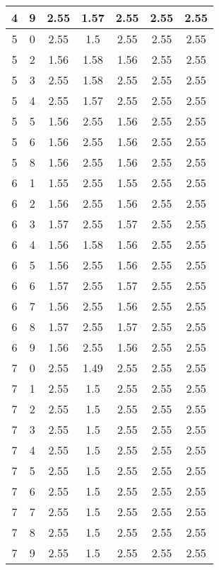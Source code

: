 \begin{longtable}{|c|c||c||c||c|c|c|}
	4 & 9 & 2.55 & 1.57 & 2.55 & 2.55 & 2.55 \\ \hline
	5 & 0 & 2.55 & 1.5 & 2.55 & 2.55 & 2.55 \\ \hline
	5 & 2 & 1.56 & 1.58 & 1.56 & 2.55 & 2.55 \\ \hline
	5 & 3 & 2.55 & 1.58 & 2.55 & 2.55 & 2.55 \\ \hline
	5 & 4 & 2.55 & 1.57 & 2.55 & 2.55 & 2.55 \\ \hline
	5 & 5 & 1.56 & 2.55 & 1.56 & 2.55 & 2.55 \\ \hline
	5 & 6 & 1.56 & 2.55 & 1.56 & 2.55 & 2.55 \\ \hline
	5 & 8 & 1.56 & 2.55 & 1.56 & 2.55 & 2.55 \\ \hline
	6 & 1 & 1.55 & 2.55 & 1.55 & 2.55 & 2.55 \\ \hline
	6 & 2 & 1.56 & 2.55 & 1.56 & 2.55 & 2.55 \\ \hline
	6 & 3 & 1.57 & 2.55 & 1.57 & 2.55 & 2.55 \\ \hline
	6 & 4 & 1.56 & 1.58 & 1.56 & 2.55 & 2.55 \\ \hline
	6 & 5 & 1.56 & 2.55 & 1.56 & 2.55 & 2.55 \\ \hline
	6 & 6 & 1.57 & 2.55 & 1.57 & 2.55 & 2.55 \\ \hline
	6 & 7 & 1.56 & 2.55 & 1.56 & 2.55 & 2.55 \\ \hline
	6 & 8 & 1.57 & 2.55 & 1.57 & 2.55 & 2.55 \\ \hline
	6 & 9 & 1.56 & 2.55 & 1.56 & 2.55 & 2.55 \\ \hline
	7 & 0 & 2.55 & 1.49 & 2.55 & 2.55 & 2.55 \\ \hline
	7 & 1 & 2.55 & 1.5 & 2.55 & 2.55 & 2.55 \\ \hline
	7 & 2 & 2.55 & 1.5 & 2.55 & 2.55 & 2.55 \\ \hline
	7 & 3 & 2.55 & 1.5 & 2.55 & 2.55 & 2.55 \\ \hline
	7 & 4 & 2.55 & 1.5 & 2.55 & 2.55 & 2.55 \\ \hline
	7 & 5 & 2.55 & 1.5 & 2.55 & 2.55 & 2.55 \\ \hline
	7 & 6 & 2.55 & 1.5 & 2.55 & 2.55 & 2.55 \\ \hline
	7 & 7 & 2.55 & 1.5 & 2.55 & 2.55 & 2.55 \\ \hline
	7 & 8 & 2.55 & 1.5 & 2.55 & 2.55 & 2.55 \\ \hline
	7 & 9 & 2.55 & 1.5 & 2.55 & 2.55 & 2.55 \\ \hline
\end{longtable}
\clearpage{}
